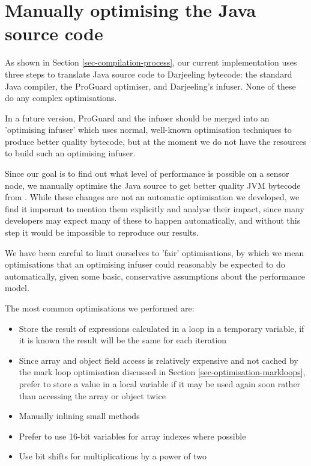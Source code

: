 \section{Manually optimising the Java source code}
\label{sec-optimisations-manual-java-source-optimisation}
As shown in Section \ref{sec-compilation-process}, our current implementation uses three steps to translate Java source code to Darjeeling bytecode: the standard Java compiler, the ProGuard optimiser, and Darjeeling's infuser. None of these do any complex optimisations. 

In a future version, ProGuard and the infuser should be merged into an 'optimising infuser' which uses normal, well-known optimisation techniques to produce better quality bytecode, but at the moment we do not have the resources to build such an optimising infuser.

Since our goal is to find out what level of performance is possible on a sensor node, we manually optimise the Java source to get better quality JVM bytecode from . While these changes are not an automatic optimisation we developed, we find it imporant to mention them explicitly and analyse their impact, since many developers may expect many of these to happen automatically, and without this step it would be impossible to reproduce our results.

We have been careful to limit ourselves to 'fair' optimisations, by which we mean optimisations that an optimising infuser could reasonably be expected to do automatically, given some basic, conservative assumptions about the performance model. 

The most common optimisations we performed are:
\begin{itemize}
	\item Store the result of expressions calculated in a loop in a temporary variable, if it is known the result will be the same for each iteration
	\item Since array and object field access is relatively expensive and not cached by the mark loop optimisation discussed in Section \ref{sec-optimisation-markloops}, prefer to store a value in a local variable if it may be used again soon rather than accessing the array or object twice
	\item Manually inlining small methods
	\item Prefer to use 16-bit variables for array indexes where possible
	\item Use bit shifts for multiplications by a power of two
\end{itemize}

